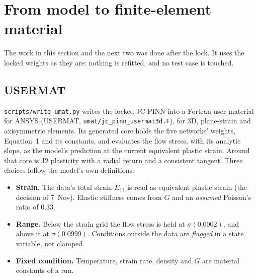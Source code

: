 \documentclass[11pt,a4paper]{article}
\newcommand{\file}[1]{\nolinkurl{#1}}
\begin{document}
\section{From model to finite-element material}
\label{sec:fe}
The work in this section and the next two was done after the lock. It uses the locked weights as they are: nothing is refitted, and no test case is touched.

\subsection{USERMAT}
\file{scripts/write_umat.py} writes the locked JC-PINN into a Fortran user material for ANSYS (USERMAT, \file{umat/jc_pinn_usermat3d.F}), for 3D, plane-strain and axisymmetric elements. Its generated core holds the five networks' weights, Equation~1 and its constants, and evaluates the flow stress, with its analytic slope, as the model's prediction at the current equivalent plastic strain. Around that core is J2 plasticity with a radial return and a consistent tangent. Three choices follow the model's own definitions:
\begin{itemize}
\item \textbf{Strain.} The data's total strain $E_{11}$ is read as equivalent plastic strain (the decision of 7~Nov). Elastic stiffness comes from $G$ and an \emph{assumed} Poisson's ratio of 0.33.
\item \textbf{Range.} Below the strain grid the flow stress is held at $\sigma(0.0002)$, and above it at $\sigma(0.0999)$. Conditions outside the data are \emph{flagged} in a state variable, not clamped.
\item \textbf{Fixed condition.} Temperature, strain rate, density and $G$ are material constants of a run.
\end{itemize}
\end{document}
